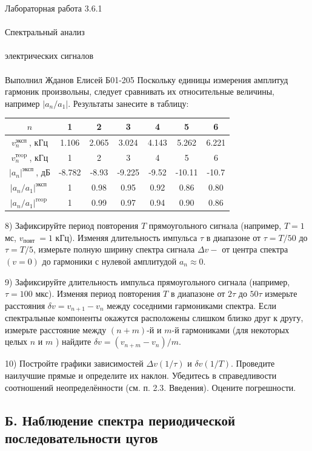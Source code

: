 \documentclass{astroedu-lab}
\begin{document}
\begin{problem}{\huge Лабораторная работа 3.6.1\\\\Спектральный анализ\\\\электрических сигналов\\\\Выполнил Жданов Елисей Б01-205}
Поскольку единицы измерения амплитуд гармоник произвольны, следует сравнивать их относительные величины, например $\left|a_n / a_1\right|$. Результаты занесите в таблицу:
\begin{center}
\begin{tabular}{|c|c|c|c|c|c|c|}
\hline$n$ & 1 & 2 & 3 & 4 & 5 & 6 \\
\hline$v_n^{\text {эксп }}$, кГц & 1.106 & 2.065 & 3.024 & 4.143 & 5.262 & 6.221 \\
\hline$v_n^{\text {тeop }}$, кГц & 1 & 2 & 3 & 4 & 5 & 6 \\
\hline$\left|a_n\right|^{\text {эксп }}$, дБ & -8.782 & -8.93 & -9.225 & -9.52 & -10.11 & -10.7 \\
\hline$\left|a_n / a_1\right|^{\text {эксп }}$ & 1 & 0.98 & 0.95 & 0.92 & 0.86 & 0.80 \\
\hline$\left|a_n / a_1\right|^{\text {reop }}$ & 1 & 0.99 & 0.97 & 0.94 & 0.90 & 0.86 \\
\hline
\end{tabular}
\end{center}


8) Зафиксируйте период повторения $T$ прямоугольного сигнала (например, $T=1$ мс, $v_{\text {повт }}=1$ кГц). Изменяя длительность импульса $\tau$ в диапазоне от $\tau=T / 50$ до $\tau=T / 5$, измерьте полную ширину спектра сигнала $\Delta v-$ от центра спектра $(v=0)$ до гармоники с нулевой амплитудой $a_n \approx 0$.

9) Зафиксируйте длительность импульса прямоугольного сигнала (например, $\tau=100$ мкс). Изменяя период повторения $T$ в диапазоне от $2 \tau$ до $50 \tau$ измерьте расстояния $\delta v=v_{n+1}-v_n$ между соседними гармониками спектра. Если спектральные компоненты окажутся расположены слишком близко друг к другу, измерьте расстояние между $(n+m)$-й и $m$-й гармониками (для некоторых целых $n$ и $m$ ) найдите $\delta v=\left(v_{n+m}-v_n\right) / m$.

10) Постройте графики зависимостей $\Delta v(1 / \tau)$ и $\delta v(1 / T)$. Проведите наилучшие прямые и определите их наклон. Убедитесь в справедливости соотношений неопределённости (см. п. 2.3. Введения). Оцените погрешности.

\subsection{Б. Наблюдение спектра периодической последовательности цугов}


\end{problem}
\end{document}
